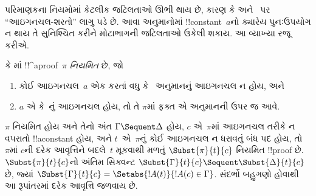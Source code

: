 \documentclass[../../../include/open-logic-section]{subfiles}
\begin{document}


પરિમાણકના નિયમોમાં કેટલીક જટિલતાઓ ઊભી થાય છે,
કારણ કે \LeftR{\lexists} અને~\RightR{\lforall} પર
``આઇગનચલ-શરતો'' લાગુ પડે છે.
આવા અનુમાનોમાં !!{constant}~$a$નો ક્યારેય પુનઃઉપયોગ ન થાય
તે સુનિશ્ચિત કરીને મોટાભાગની જટિલતાઓ ઉકેલી શકાય.
આ વ્યાખ્યા રજૂ કરીએ.

\begin{defn}
 કે માં !!^a{proof}~$\pi$ \emph{નિયમિત} છે, જો
\begin{enumerate}
  \item કોઈ આઇગનચલ~$a$ એક કરતાં વધુ
  \LeftR{\lexists} કે~\RightR{\lforall} અનુમાનનું આઇગનચલ ન હોય, અને
  \item $a$ એ \LeftR{\lexists} કે~\RightR{\lforall}નું આઇગનચલ હોય,
  તો તે $\pi$માં ફક્ત એ અનુમાનની ઉપર જ આવે.
\end{enumerate}
\end{defn}

\begin{lem}
$\pi$ નિયમિત હોય અને તેનો અંત $\Gamma \Sequent \Delta$ હોય,
$c$ એ~$\pi$માં આઇગનચલ તરીકે ન વપરાતો !!a{constant} હોય,
અને $t$~એ~$\pi$નું કોઈ આઇગનચલ ન ધરાવતું બંધ પદ હોય,
તો~$\pi$માં $c$ની દરેક આવૃત્તિને બદલે~$t$ મૂકવાથી મળતું
$\Subst{\pi}{t}{c}$ નિયમિત !!{proof} છે.
$\Subst{\pi}{t}{c}$નો અંતિમ સિક્વન્ટ
$\Subst{\Gamma}{t}{c} \Sequent \Subst{\Delta}{t}{c}$ છે,
જ્યાં $\Subst{\Gamma}{t}{c} =
\Setabs{!A(t)}{!A(c) \in \Gamma}$.
સંદર્ભો બહુગણો હોવાથી આ રૂપાંતરમાં દરેક આવૃત્તિ જળવાય છે.
\end{lem}
\end{document}
